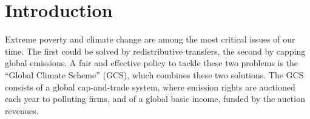 \onehalfspacing %

\section{Introduction}  %

Extreme poverty and climate change are among the most critical issues of our time. The first could be solved by redistributive transfers, the second by capping global emissions. %
A fair and effective policy to tackle these two problems is the ``Global Climate Scheme'' (GCS), which combines these two solutions. The GCS consists of a global cap-and-trade system, where emission rights are auctioned each year to polluting firms, and of a global basic income, funded by the auction revenues. %


